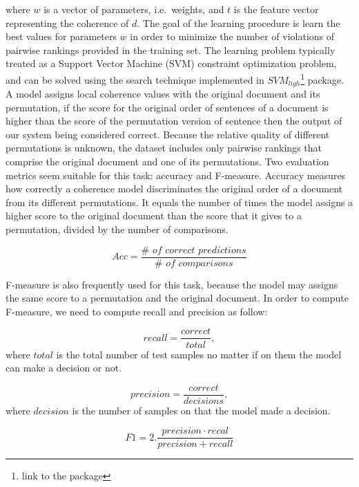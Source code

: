 where $w$ is a vector of parameters, i.e.\ weights, and $t$ is the feature vector representing the coherence of $d$. 
The goal of the learning procedure is learn the best values for parameters $w$ in order to minimize the number of violations of pairwise rankings provided in the training set. 
The learning problem typically treated as a Support Vector Machine (SVM) constraint optimization problem, and can be solved using the search technique implemented in $SVM_{ligh}$\footnote{link to the package} \cite{joachims02} package. 
A model assigns local coherence values with the original document and its permutation, if the score for the original order of sentences of a document is higher than the score of the permutation version of sentence then the output of our system being considered correct. 
Because the relative quality of different permutations is unknown, the dataset includes only pairwise rankings that comprise the original document and one of its permutations.
Two evaluation metrics seem suitable for this task: accuracy and F-measure. 
Accuracy measures how correctly a coherence model discriminates the original order of a document from its different permutations.
It equals the number of times the model assigns a higher score to the original document than the score that it gives to a permutation, divided by the number of comparisons.

\begin{equation}
Acc  = \frac{\#\textit{ of correct predictions}}{\#\textit{ of comparisons}}
\end{equation}

F-measure is also frequently used for this task, because the model may assigns the same score to a permutation and the original document. 
In order to compute F-measure, we need to compute recall and precision as follow:

\begin{equation}
recall = \frac{correct}{total},
\end{equation}
where $total$ is the total number of test samples no matter if on them the model can make a decision or not. 

\begin{equation}
precision = \frac{correct}{decisions},
\end{equation}
where $decision$ is the number of samples on that the model made a decision.

\begin{equation}
F1 = 2.\frac{precision \cdot recal}{precision + recall}
\end{equation}

